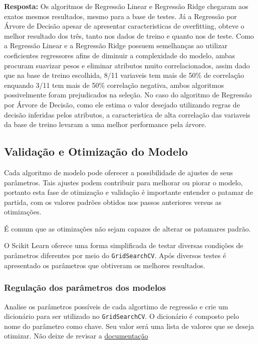 \documentclass[11pt]{article}
\begin{document}
\textbf{Resposta:} Os algoritmos de Regressão Linear e Regressão Ridge
chegaram aos exatos mesmos resultados, mesmo para a base de testes. Já a
Regressão por Árvore de Decisão apesar de apresentar caracteristicas de
overfitting, obteve o melhor resultado dos três, tanto nos dados de
treino e quanto nos de teste. Como a Regressão Linear e a Regressão
Ridge possuem semelhanças ao utilizar coeficientes regressores afins de
diminuir a complexidade do modelo, ambas procuram suavizar pesos e
eliminar atributos muito correlacionados, assim dado que na base de
treino escolhida, 8/11 variaveis tem mais de 50\% de correlação enquando
3/11 tem mais de 50\% correlação negativa, ambos algoritmos
possivelmente foram prejudicados na seleção. No caso do algoritmo de
Regressão por Árvore de Decisão, como ele estima o valor desejado
utilizando regras de decisão inferidas pelos atributos, a caracteristica
de alta correlação das variaveis da base de treino levaram a uma melhor
performance pela árvore.

    \subsection{Validação e Otimização do
Modelo}\label{validauxe7uxe3o-e-otimizauxe7uxe3o-do-modelo}

Cada algoritmo de modelo pode oferecer a possibilidade de ajustes de
seus parâmetros. Tais ajustes podem contribuir para melhorar ou piorar o
modelo, portanto esta fase de otimização e validação é importante
entender o patamar de partida, com os valores padrões obtidos nos passos
anteriores versus as otimizações.

É comum que as otimizações não sejam capazes de alterar os patamares
padrão.

O Scikit Learn oferece uma forma simplificada de testar diversas
condições de parâmetros diferentes por meio do \texttt{GridSearchCV}.
Após diversos testes é apresentado os parâmetros que obtiveram os
melhores resultados.

    \subsubsection{Regulação dos parâmetros dos
modelos}\label{regulauxe7uxe3o-dos-paruxe2metros-dos-modelos}

Analise os parâmetros possíveis de cada algortimo de regressão e crie um
dicionário para ser utilizado no \texttt{GridSearchCV}. O dicionário é
composto pelo nome do parâmetro como chave. Seu valor será uma lista de
valores que se deseja otimizar. Não deixe de revisar a
\href{http://scikit-learn.org/stable/modules/generated/sklearn.model_selection.GridSearchCV.html}{documentação}
\end{document}
